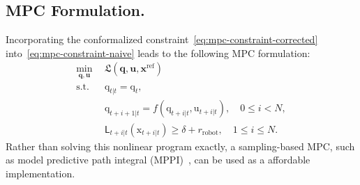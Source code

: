 \documentclass[lettersize,journal]{IEEEtran}
\begin{document}
\subsection{MPC Formulation.}
Incorporating the conformalized constraint~\eqref{eq:mpc-constraint-corrected} into~\eqref{eq:mpc-constraint-naive} leads to the following MPC formulation:
\begin{align}
\min_{\mathbf{q}, \mathbf{u}}&\ \ \mathfrak{L}(\mathbf{q}, \mathbf{u}, \mathbf{x}^{\text{ref}}) \nonumber \\
\text{s.t.}
&\ \ \mathrm{q}_{t|t} = \mathrm{q}_t, \nonumber \\
&\ \ \mathrm{q}_{t+i+1|t} = f(\mathrm{q}_{t+i|t}, \mathrm{u}_{t+i|t}), \quad 0 \leq i < N, \nonumber\\
&\ \ \mathsf{L}_{t+i|t}(\mathrm{x}_{t+i|t}) \geq \delta + r_{\text{robot}}, \quad 1\leq i \leq N. \label{eq:mpc-constraint-fcp}
\end{align}
Rather than solving this nonlinear program exactly, a sampling-based MPC, such as model predictive path integral (MPPI)~\cite{williams2017information}, can be used as a affordable implementation.
\end{document}
